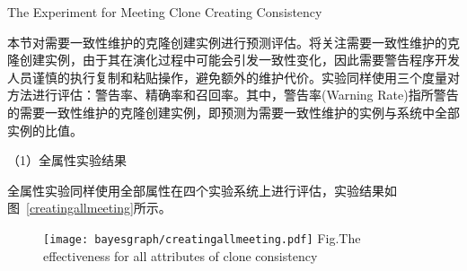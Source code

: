 
{The Experiment for Meeting Clone Creating Consistency}

本节对需要一致性维护的克隆创建实例进行预测评估。将关注需要一致性维护的克隆创建实例，由于其在演化过程中可能会引发一致性变化，因此需要警告程序开发人员谨慎的执行复制和粘贴操作，避免额外的维护代价。实验同样使用三个度量对方法进行评估：警告率、精确率和召回率。其中，警告率(Warning Rate)指所警告的需要一致性维护的克隆创建实例，即预测为需要一致性维护的实例与系统中全部实例的比值。


（1）全属性实验结果

全属性实验同样使用全部属性在四个实验系统上进行评估，实验结果如图~\ref{creatingallmeeting}所示。

\begin{figure}[h]
\centering
\texttt{[image: bayesgraph/creatingallmeeting.pdf]}
{Fig.$\!$}{The effectiveness for all attributes of clone consistency}
\vspace{-1em}
\end{figure}

